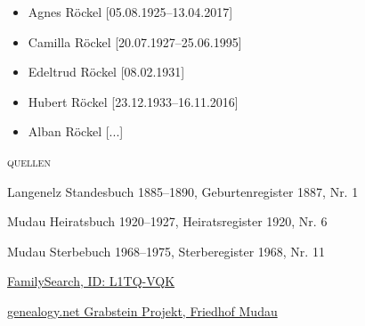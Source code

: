 \begin{person}[
    surname = {Röckel},
    givenname = {Wilhelm},
    suffix = {1887--1968},
    label = {@I472@},
    filename = {Wilhelm Röckel (1887)}
    ]
\begin{itemize}
\item Agnes Röckel [05.08.1925--13.04.2017]
\item Camilla Röckel [20.07.1927--25.06.1995]
\item Edeltrud Röckel [08.02.1931]
\item Hubert Röckel [23.12.1933--16.11.2016]
\item Alban Röckel [...]
\end{itemize}
\medbreak
\textsc{{quellen}}
\begin{enumerate}[label={[\arabic*]}]
\item Langenelz Standesbuch 1885–1890, Geburtenregister 1887, Nr. 1
\item Mudau Heiratsbuch 1920–1927, Heiratsregister 1920, Nr. 6
\item Mudau Sterbebuch 1968–1975, Sterberegister 1968, Nr. 11
\item \href{https://www.familysearch.org/tree/person/details/L1TQ-VQK}{FamilySearch, ID: L1TQ-VQK}
\item \href{http://grabsteine.genealogy.net/tomb.php?cem=3902&tomb=372&b=&lang=de}{genealogy.net Grabstein Projekt, Friedhof Mudau}
\end{enumerate}

\end{person}

